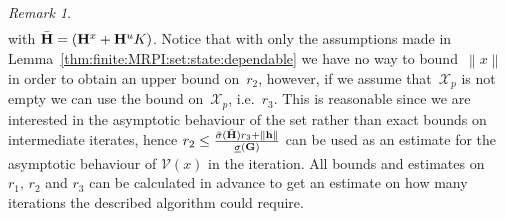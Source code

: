 \documentclass[journal]{IEEEtran}
\providecommand{\norm}[1]{\left\|#1\right\|}
\newcounter{thmcount}
\theoremstyle{remark}
\newtheorem{rem}[thmcount]{Remark}
\theoremstyle{definition}
\begin{document}
\begin{rem}
\begin{multline}
\end{multline}
%
with $\bar{\bf{H}} = ({\bf{H}}^x + {\bf{H}}^u K)$.
%
Notice that with only the assumptions made in Lemma~\ref{thm:finite:MRPI:set:state:dependable}
we have no way to bound~$\norm{x}$ in order to obtain an upper bound on~$r_2$,
however, if we assume that~$\mathcal X_p$ is not empty we can use the bound on~$\mathcal X_p$, i.e.~$r_3$.
%
This is reasonable since we are interested in the asymptotic behaviour of the set rather than
exact bounds on intermediate iterates, hence $r_2\leq\frac{\bar\sigma(\bar{\bf{H}})r_3+\norm{{\bf{h}}}}
{\underline\sigma({\bf{G}})}$ can be used as an estimate for the asymptotic behaviour of $\mathcal V(x)$
in the iteration.
%
All bounds and estimates on $r_1,\,r_2$ and $r_3$ can be calculated in advance to get an estimate
on how many iterations the described algorithm could require.
\end{rem}
%
%
%
%
%
\end{document}
